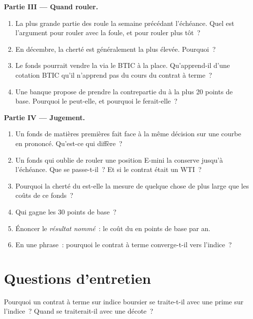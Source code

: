 \begin{problem}
\medskip\noindent\textbf{Partie III --- Quand rouler.}
\begin{enumerate}[resume]
\item La plus grande partie des  roule la semaine précédant l'échéance. Quel est
l'argument pour rouler avec la foule, et pour rouler plus tôt~?
\item En décembre, la cherté est généralement la plus élevée. Pourquoi~?
\item Le fonds pourrait vendre la  via le BTIC à la place. Qu'apprend-il d'une cotation BTIC
qu'il n'apprend pas du cours du contrat à terme~?
\item Une banque propose de prendre la contrepartie du  à la  plus 20
points de base. Pourquoi le peut-elle, et pourquoi le ferait-elle~?
\end{enumerate}

\medskip\noindent\textbf{Partie IV --- Jugement.}
\begin{enumerate}[resume]
\item Un fonds de matières premières fait face à la même décision sur une courbe en
 prononcé. Qu'est-ce qui diffère~?
\item Un fonds qui oublie de rouler une position E-mini la conserve jusqu'à l'échéance.
Que se passe-t-il~? Et si le contrat était un WTI~?
\item Pourquoi la cherté du  est-elle la mesure de quelque chose de plus large que
les coûts de ce fonds~?
\item Qui gagne les 30 points de base~?
\item Énoncer le \emph{résultat nommé}~: le coût du  en points de base par
an.
\item En une phrase~: pourquoi le contrat à terme converge-t-il vers l'indice~?
\end{enumerate}
\end{problem}

\section{Questions d'entretien}

\begin{interviewq}\label{iq:m1:basis-roll-and-delivery:1}
Pourquoi un contrat à terme sur indice boursier se traite-t-il avec une prime sur l'indice~? Quand
se traiterait-il avec une décote~?
\end{interviewq}

